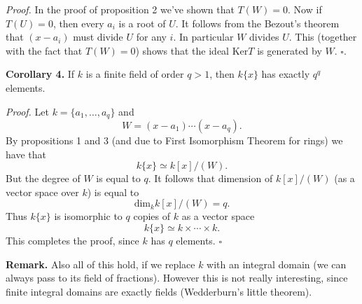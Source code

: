 \documentclass[12pt]{article}
\begin{document}
\textit{Proof.} In the proof of proposition 2 we've shown that $T(W)=0$. Now if $T(U)=0$, then every $a_i$ is a root of $U$. It follows from the Bezout's theorem that $(x-a_i)$ must divide $U$ for any $i$. In particular $W$ divides $U$. This (together with the fact that $T(W)=0$) shows that the ideal $\mathrm{Ker}T$ is generated by $W$. $\square$.

\textbf{Corollary 4.} If $k$ is a finite field of order $q>1$, then $k\{x\}$ has exactly $q^q$ elements.

\textit{Proof.} Let $k=\{a_1,\ldots,a_q\}$ and 
$$W=(x-a_1)\cdots (x-a_q).$$
By propositions 1 and 3 (and due to First Isomorphism Theorem for rings) we have that
$$k\{x\}\simeq k[x]/(W).$$
But the degree of $W$ is equal to $q$. It follows that dimension of $k[x]/(W)$ (as a vector space over $k$) is equal to
$$\mathrm{dim}_{k}k[x]/(W)=q.$$
Thus $k\{x\}$ is isomorphic to $q$ copies of $k$ as a vector space
$$k\{x\}\simeq k\times\cdots\times k.$$
This completes the proof, since $k$ has $q$ elements. $\square$

\textbf{Remark.} Also all of this hold, if we replace $k$ with an integral domain (we can always pass to its field of fractions). However this is not really interesting, since finite integral domains are exactly fields (Wedderburn's little theorem).
\end{document}
